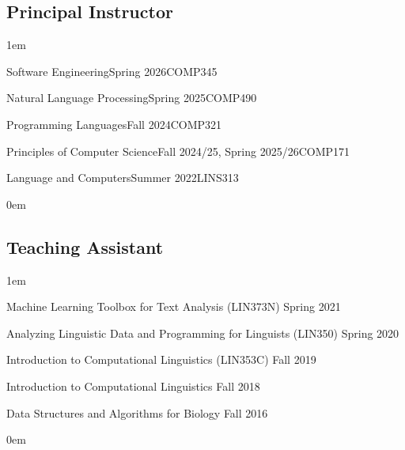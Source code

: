 \subsection{Principal Instructor}
\leftskip1em\relax

  {Software Engineering}{Spring 2026}{COMP345}{}

  {Natural Language Processing}{Spring 2025}{COMP490}{}

  {Programming Languages}{Fall 2024}{COMP321}{}

  {Principles of Computer Science}{Fall 2024/25, Spring 2025/26}{COMP171}{}

  {Language and Computers}{Summer 2022}{LINS313}{}

\leftskip0em\relax

\subsection{Teaching Assistant}
\leftskip1em\relax
\vspace{0.6\baselineskip}

\textbullet\enspace Machine Learning Toolbox for Text Analysis ({\rmsc LIN373N}) \hfill Spring 2021

\textbullet\enspace Analyzing Linguistic Data and Programming for Linguists ({\rmsc LIN350}) \hfill Spring 2020

\textbullet\enspace Introduction to Computational Linguistics ({\rmsc LIN353C}) \hfill Fall 2019

\textbullet\enspace Introduction to Computational Linguistics \hfill Fall 2018

\textbullet\enspace Data Structures and Algorithms for Biology \hfill Fall 2016

\leftskip0em\relax
